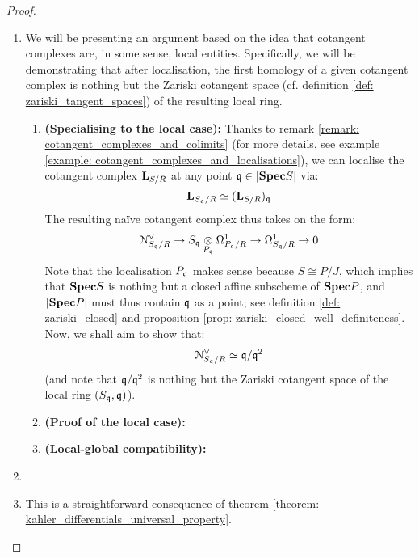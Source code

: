                     \begin{proof}
                        \noindent
                        \begin{enumerate}
                            \item We will be presenting an argument based on the idea that cotangent complexes are, in some sense, local entities. Specifically, we will be demonstrating that after localisation, the first homology of a given cotangent complex is nothing but the Zariski cotangent space (cf. definition \ref{def: zariski_tangent_spaces}) of the resulting local ring.
                                \begin{enumerate}
                                    \item \textbf{(Specialising to the local case):} Thanks to remark \ref{remark: cotangent_complexes_and_colimits} (for more details, see example \ref{example: cotangent_complexes_and_localisations}), we can localise the cotangent complex $\mathbf{L}_{S/R}$ at any point $\mathfrak{q} \in |\mathbf{Spec} S|$ via:
                                        $$\mathbf{L}_{S_{\mathfrak{q}}/R} \simeq (\mathbf{L}_{S/R})_{\mathfrak{q}}$$
                                    The resulting na\"ive cotangent complex thus takes on the form:
                                        $$\calN^{\vee}_{S_{\q}/R} \to S_{\q} \tensor_{P_{\q}} \Omega^1_{P_{\q}/R} \to \Omega^1_{S_{\q}/R} \to 0$$
                                    Note that the localisation $P_{\mathfrak{q}}$ makes sense because $S \cong P/J$, which implies that $\mathbf{Spec} S$ is nothing but a closed affine subscheme of $\mathbf{Spec} P$, and $|\mathbf{Spec} P|$ must thus contain $\mathfrak{q}$ as a point; see definition \ref{def: zariski_closed} and proposition \ref{prop: zariski_closed_well_definiteness}. Now, we shall aim to show that:
                                        $$\mathcal{N}^{\vee}_{S_{\mathfrak{q}}/R} \simeq \mathfrak{q}/\mathfrak{q}^2$$
                                    (and note that $\mathfrak{q}/\mathfrak{q}^2$ is nothing but the Zariski cotangent space of the local ring $(S_{\mathfrak{q}}, \mathfrak{q})$).
                                    \item \textbf{(Proof of the local case):} 
                                    \item \textbf{(Local-global compatibility):}
                                \end{enumerate}
                            \item 
                            \item This is a straightforward consequence of theorem \ref{theorem: kahler_differentials_universal_property}.
                        \end{enumerate}
                    \end{proof}
